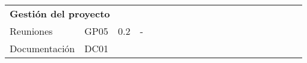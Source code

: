 \begin{longtable}[c]{llclllllllllllllllll}
        \multicolumn{4}{|l|}{\textbf{Gestión del proyecto}}                                                                                                                                                                                                                                                                                              & \multicolumn{15}{l|}{}                                                                                                                                                                                                                                                                                                                                                                                                                                                                                                                    &  \\ \cline{1-19}
        \multicolumn{1}{|l|}{Reuniones}                                                       & \multicolumn{1}{l|}{GP05}                                                      & \multicolumn{1}{l|}{0.2}                                                         & \multicolumn{1}{l|}{-}                                                               &                                 &                                 &                                 &                                 &                                 &                                 &                                 &                                 & \cellcolor[HTML]{EF8787}        &                                 &                                 &                                 &                                 &                                 & \multicolumn{1}{l|}{}                         &  \\ \cline{1-4}
        \multicolumn{1}{|l|}{Documentación}                                                   & \multicolumn{1}{l|}{DC01}                                                      & \multicolumn{1}{l|}{}                                                            & \multicolumn{1}{l|}{}                                                                &                                 &                                 &                                 &                                 &                                 &                                 &                                 &                                 &                                 &                                 &                                 &                                 &                                 &                                 & \multicolumn{1}{l|}{}                         &  \\ \cline{1-19}

\end{longtable}
